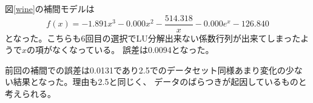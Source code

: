 \documentclass[a4paper,11pt,dvipdfmx]{jsarticle}
\begin{document}
図\ref{wine}の補間モデルは
\[f(x) = -1.891x^3 - 0.000x^2  - \frac{514.318}{x} - 0.000e^x -126.840\]
となった。こちらも6回目の選択でLU分解出来ない係数行列が出来てしまったようで$x$の項がなくなっている。
誤差は0.0094となった。

前回の補間での誤差は0.0131であり2.5でのデータセット同様あまり変化の少ない結果となった。理由も2.5と同じく、
データのばらつきが起因しているものと考えられる。




\end{document}
